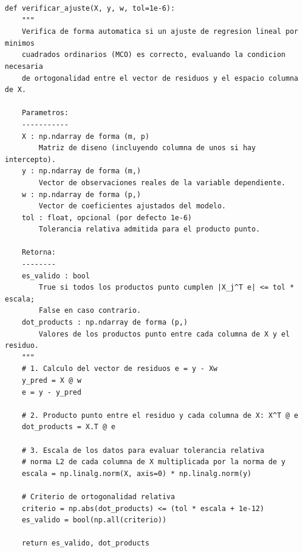 \documentclass[12pt,a4paper]{article}
\begin{document}
\begin{lstlisting}
def verificar_ajuste(X, y, w, tol=1e-6):
    """
    Verifica de forma automatica si un ajuste de regresion lineal por minimos
    cuadrados ordinarios (MCO) es correcto, evaluando la condicion necesaria
    de ortogonalidad entre el vector de residuos y el espacio columna de X.

    Parametros:
    -----------
    X : np.ndarray de forma (m, p)
        Matriz de diseno (incluyendo columna de unos si hay intercepto).
    y : np.ndarray de forma (m,)
        Vector de observaciones reales de la variable dependiente.
    w : np.ndarray de forma (p,)
        Vector de coeficientes ajustados del modelo.
    tol : float, opcional (por defecto 1e-6)
        Tolerancia relativa admitida para el producto punto.

    Retorna:
    --------
    es_valido : bool
        True si todos los productos punto cumplen |X_j^T e| <= tol * escala;
        False en caso contrario.
    dot_products : np.ndarray de forma (p,)
        Valores de los productos punto entre cada columna de X y el residuo.
    """
    # 1. Calculo del vector de residuos e = y - Xw
    y_pred = X @ w
    e = y - y_pred
    
    # 2. Producto punto entre el residuo y cada columna de X: X^T @ e
    dot_products = X.T @ e
    
    # 3. Escala de los datos para evaluar tolerancia relativa
    # norma L2 de cada columna de X multiplicada por la norma de y
    escala = np.linalg.norm(X, axis=0) * np.linalg.norm(y)
    
    # Criterio de ortogonalidad relativa
    criterio = np.abs(dot_products) <= (tol * escala + 1e-12)
    es_valido = bool(np.all(criterio))
    
    return es_valido, dot_products
\end{lstlisting}
\end{document}
